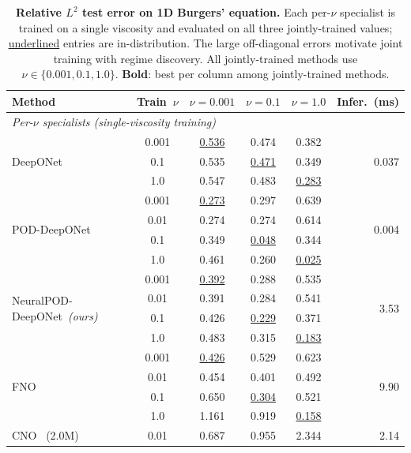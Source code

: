 \documentclass[preprint,10pt]{elsarticle}
\begin{document}
\begin{table}[!htbp]
\centering
\small
\setlength{\tabcolsep}{5pt}
\caption{\textbf{Relative $L^2$ test error on 1D Burgers' equation.}
  Each per-$\nu$ specialist is trained on a single viscosity and evaluated on
  all three jointly-trained values; \underline{underlined} entries are in-distribution.
  The large off-diagonal errors motivate joint training with regime discovery.
  All jointly-trained methods use $\nu\in\{0.001,0.1,1.0\}$.
  \textbf{Bold}: best per column among jointly-trained methods.}
\label{tab:results}
\begin{tabular}{l c c c c r}
\toprule
Method & Train~$\nu$
  & $\nu{=}0.001$ & $\nu{=}0.1$ & $\nu{=}1.0$ & Infer.~(ms) \\
\midrule
\multicolumn{6}{l}{\textit{Per-$\nu$ specialists (single-viscosity training)}} \\[2pt]
\multirow{3}{*}{DeepONet~\cite{Lu2019}}
  & 0.001 & \underline{0.536} & 0.474 & 0.382 & \multirow{3}{*}{0.037} \\
  & 0.1   & 0.535 & \underline{0.471} & 0.349 & \\
  & 1.0   & 0.547 & 0.483 & \underline{0.283} & \\[4pt]
\multirow{4}{*}{POD-DeepONet~\cite{Lu2022}}
  & 0.001 & \underline{0.273} & 0.297 & 0.639 & \multirow{4}{*}{0.004} \\
  & 0.01  & 0.274 & 0.274 & 0.614 & \\
  & 0.1   & 0.349 & \underline{0.048} & 0.344 & \\
  & 1.0   & 0.461 & 0.260 & \underline{0.025} & \\[4pt]
\multirow{4}{*}{NeuralPOD-DeepONet~\textit{(ours)}}
  & 0.001 & \underline{0.392} & 0.288 & 0.535 & \multirow{4}{*}{3.53} \\
  & 0.01  & 0.391 & 0.284 & 0.541 & \\
  & 0.1   & 0.426 & \underline{0.229} & 0.371 & \\
  & 1.0   & 0.483 & 0.315 & \underline{0.183} & \\[4pt]
\multirow{4}{*}{FNO~\cite{Li2021}}
  & 0.001 & \underline{0.426} & 0.529 & 0.623 & \multirow{4}{*}{9.90} \\
  & 0.01  & 0.454 & 0.401 & 0.492 & \\
  & 0.1   & 0.650 & \underline{0.304} & 0.521 & \\
  & 1.0   & 1.161 & 0.919 & \underline{0.158} & \\[4pt]
\multirow{3}{*}{CNO~\cite{Raonic2023} \small{(2.0M)}}
  & 0.01  & 0.687 & 0.955 & 2.344 & \multirow{3}{*}{2.14} \\

\end{tabular}
\end{table}
\end{document}
